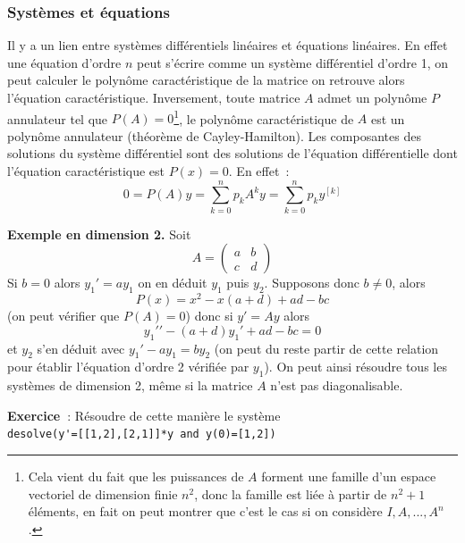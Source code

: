 \documentclass[a4paper,11pt]{article}
\begin{document}
\begin{giacjshere}
\subsubsection{Syst\`emes et \'equations}
Il y a un lien entre syst\`emes diff\'erentiels lin\'eaires
et \'equations lin\'eaires. En effet une \'equation d'ordre $n$ peut
s'\'ecrire comme un syst\`eme diff\'erentiel d'ordre 1,
on peut calculer le polyn\^ome caract\'eristique de la matrice
on retrouve alors l'\'equation caract\'eristique. Inversement,
toute matrice $A$ admet un polyn\^ome $P$
annulateur tel que $P(A)=0$\footnote{Cela vient du fait que
les puissances de $A$ forment une famille d'un
espace vectoriel de dimension finie $n^2$, donc la famille est li\'ee
\`a partir de $n^2+1$ \'el\'ements, en fait on peut montrer
que c'est le cas si on consid\`ere $I,A,...,A^n$.},
le polyn\^ome caract\'eristique de $A$ est un polyn\^ome annulateur
(th\'eor\`eme de Cayley-Hamilton).
Les composantes des solutions du syst\`eme diff\'erentiel sont des 
solutions de l'\'equation diff\'erentielle dont l'\'equation
caract\'eristique est $P(x)=0$. En effet~:
$$0=P(A)y=\sum_{k=0}^n p_k A^k y = \sum_{k=0}^n p_k y^{[k]}$$

{\bf Exemple en dimension 2.}
Soit $$A=\left(\begin{array}{cc}
a & b \\
c & d
\end{array}\right) $$
Si $b=0$ alors $y_1'=ay_1$ on en d\'eduit
$y_1$ puis $y_2$. Supposons donc $b\neq 0$, alors
$$ P(x)=x^{2} - x (a+d) +a d-b c$$
(on peut v\'erifier que $P(A)=0$)
donc si $y'=Ay$ alors 
$$ y_1'{'}-(a+d)y_1'+ad-bc=0$$
et $y_2$ s'en d\'eduit avec $y_1'-ay_1=by_2$ (on peut du reste
partir de cette relation pour \'etablir l'\'equation d'ordre 2
v\'erifi\'ee par $y_1$). On peut ainsi
r\'esoudre tous les syst\`emes de dimension 2, m\^eme
si la matrice $A$ n'est pas diagonalisable.

{\bf Exercice~}: R\'esoudre de cette mani\`ere le syst\`eme\\
\verb|desolve(y'=[[1,2],[2,1]]*y and y(0)=[1,2])|\\


\end{giacjshere}
\end{document}
